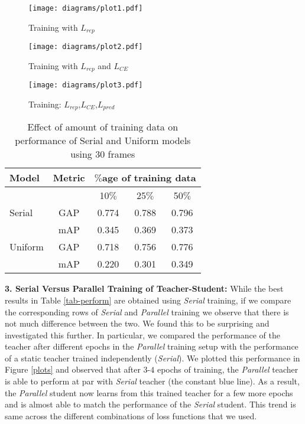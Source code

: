 \documentclass[10pt,twocolumn,letterpaper]{article}
\begin{document}
\begin{figure*}[t]
    \begin{subfigure}[b]{0.33\textwidth}
        \texttt{[image: diagrams/plot1.pdf]}
        \caption{Training with $L_{rep}$}
        \label{plot1}
    \end{subfigure} \begin{subfigure}[b]{0.33\textwidth}
      \texttt{[image: diagrams/plot2.pdf]}
      \caption{Training with $L_{rep}$ and $L_{CE}$}
      \label{plot2}
    \end{subfigure} \begin{subfigure}[b]{0.33\textwidth}
      \texttt{[image: diagrams/plot3.pdf]}
      \caption{Training: $L_{rep}$,$L_{CE}$,$L_{pred}$}
      \label{plot3}
    \end{subfigure}
    \caption{Performance comparison (\textsc{GAP} score) of different variants of \textit{Serial} and \textit{Parallel} methods in \textit{Teacher}-\textit{Student} training.}\label{plots}
\end{figure*}
\begin{table}[t]
\centering
\begin{tabular}{l|c|ccc}
\toprule
Model & Metric & \multicolumn{3}{c}{$\%$age of training data} \\
\toprule
 & \multicolumn{1}{|l|}{} & 10$\%$ & 25$\%$ & 50$\%$ \\ 
 \toprule
Serial & GAP & 0.774 & 0.788 & 0.796 \\ 
 & mAP & 0.345 & 0.369 & 0.373 \\ 
 \midrule
Uniform & GAP & 0.718 & 0.756 & 0.776 \\ 
 & mAP & 0.220 & 0.301 & 0.349 \\ 
 \bottomrule
\end{tabular}
\caption{Effect of amount of training data on performance of Serial and Uniform models using $30$ frames}
\label{tab-data}
\end{table}
\noindent\textbf{3. Serial Versus Parallel Training of Teacher-Student:} While the best results in Table \ref{tab-perform} are obtained using \textit{Serial} training, if we compare the corresponding rows of \textit{Serial} and \textit{Parallel} training we observe that there is not much difference between the two. We found this to be surprising and investigated this further. In particular, we compared the performance of the teacher after different epochs in the \textit{Parallel} training setup with the performance of a static teacher trained independently (\textit{Serial}). We plotted this performance in Figure \ref{plots} and observed that after $3$-$4$ epochs of training, the \textit{Parallel} teacher is able to perform at par with \textit{Serial} teacher (the constant blue line). As a result, the \textit{Parallel} student now learns from this trained teacher for a few more epochs and is almost able to match the performance of the \textit{Serial} student. This trend is same across the different combinations of loss functions that we used.
\end{document}
